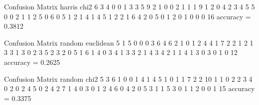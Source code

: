\documentclass[12pt]{article}
\begin{document}
Confusion Matrix harris chi2 
     6     3     4     0     0     1     3     3
     5     9     2     1     0     0     2     1
     1     1     9     1     2     0     4     2
     3     4     5     5     0     0     2     1
     1     2     5     0     6     0     5     1
     2     1     4     1     4     5     1     2
     2     1     6     4     2     0     5     0
     1     2     0     1     0     0     0    16
accuracy =
    0.3812

Confusion Matrix random euclidean 
     5     1     5     0     0     0     3     6
     4     6     2     1     0     1     2     4
     4     1     7     2     2     1     2     1
     3     3     1     3     0     2     3     5
     2     3     2     0     5     1     6     1
     4     0     3     4     1     3     3     2
     1     4     3     4     2     1     1     4
     1     3     0     3     0     1     0    12
accuracy =
    0.2625

Confusion Matrix random chi2 
     5     3     6     1     0     0     1     4
     1     4     5     1     0     1     1     7
     2     2    10     1     1     0     2     2
     3     4     0     2     0     2     4     5
     0     2     4     2     7     1     4     0
     3     0     1     2     4     6     0     4
     2     0     5     3     1     1     5     3
     0     1     1     2     0     0     1    15
accuracy =
    0.3375
\end{document}

